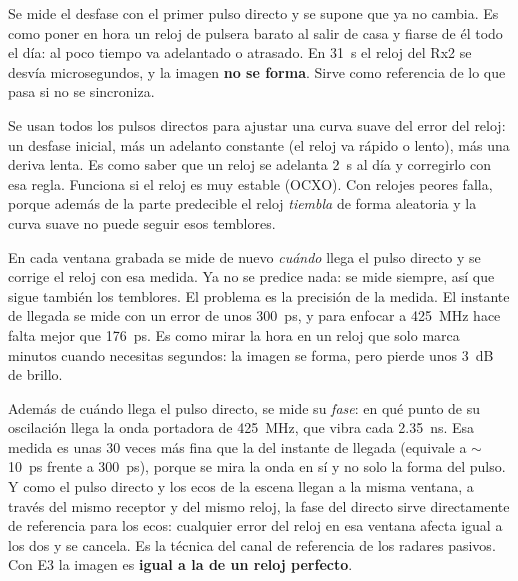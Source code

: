\documentclass[11pt,a4paper]{article}
\begin{document}
\begin{description}[leftmargin=1.2em, style=nextline]
\item[E0 --- ``poner el reloj en hora una vez'' (offset)]
  Se mide el desfase con el primer pulso directo y se supone que ya no
  cambia. Es como poner en hora un reloj de pulsera barato al salir de casa y
  fiarse de él todo el día: al poco tiempo va adelantado o atrasado. En 31~s
  el reloj del Rx2 se desvía microsegundos, y la imagen \textbf{no se forma}.
  Sirve como referencia de lo que pasa si no se sincroniza.

\item[E1 --- ``aprender cómo se desvía el reloj'' (modelo)]
  Se usan todos los pulsos directos para ajustar una curva suave del error
  del reloj: un desfase inicial, más un adelanto constante (el reloj va
  rápido o lento), más una deriva lenta. Es como saber que un reloj se
  adelanta 2~s al día y corregirlo con esa regla. Funciona si el reloj es
  muy estable (OCXO). Con relojes peores falla, porque además de la parte
  predecible el reloj \emph{tiembla} de forma aleatoria y la curva suave no
  puede seguir esos temblores.

\item[E2 --- ``mirar la hora en cada pulso'' (solo tiempo)]
  En cada ventana grabada se mide de nuevo \emph{cuándo} llega el pulso
  directo y se corrige el reloj con esa medida. Ya no se predice nada: se
  mide siempre, así que sigue también los temblores. El problema es la
  precisión de la medida. El instante de llegada se mide con un error de
  unos 300~ps, y para enfocar a 425~MHz hace falta mejor que 176~ps. Es como
  mirar la hora en un reloj que solo marca minutos cuando necesitas
  segundos: la imagen se forma, pero pierde unos 3~dB de brillo.

\item[E3 --- ``mirar la hora y el segundero en cada pulso'' (tiempo + fase)]
  Además de cuándo llega el pulso directo, se mide su \emph{fase}: en qué
  punto de su oscilación llega la onda portadora de 425~MHz, que vibra cada
  2.35~ns. Esa medida es unas 30 veces más fina que la del instante de
  llegada (equivale a $\sim$10~ps frente a 300~ps), porque se mira la onda en sí y no solo
  la forma del pulso. Y como el pulso directo y los ecos de la escena llegan
  a la misma ventana, a través del mismo receptor y del mismo reloj, la fase
  del directo sirve directamente de referencia para los ecos: cualquier
  error del reloj en esa ventana afecta igual a los dos y se cancela. Es la
  técnica del canal de referencia de los radares pasivos. Con E3 la imagen
  es \textbf{igual a la de un reloj perfecto}.
\end{description}
\end{document}
